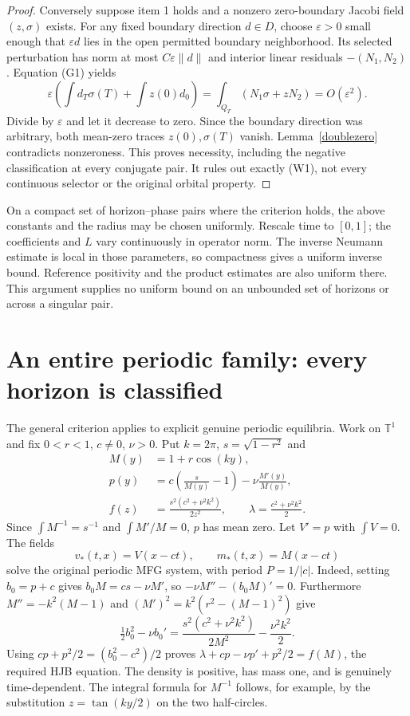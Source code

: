 \documentclass[11pt,a4paper]{article}
\begin{document}
\begin{proof}
Conversely suppose item 1 holds and a nonzero zero-boundary Jacobi
field $(z,\sigma)$ exists. For any fixed boundary direction
$d\in D$, choose $\varepsilon>0$ small enough that $\varepsilon d$
lies in the open permitted boundary neighborhood. Its selected
perturbation has norm at most $C\varepsilon\|d\|$ and interior
linear residuals $-(N_1,N_2)$. Equation (G1) yields
\[
 \varepsilon\left(\int d_T\sigma(T)+\int z(0)d_0\right)
   =\int_{Q_T}(N_1\sigma+zN_2)=O(\varepsilon^2).
\]
Divide by $\varepsilon$ and let it decrease to zero. Since the
boundary direction was arbitrary, both mean-zero traces
$z(0),\sigma(T)$ vanish. Lemma~\ref{doublezero} contradicts
nonzeroness. This proves necessity, including the negative
classification at every conjugate pair. It rules out exactly (W1),
not every continuous selector or the original orbital property.
\end{proof}

On a compact set of horizon--phase pairs where the criterion holds,
the above constants and the radius may be chosen uniformly. Rescale
time to $[0,1]$; the coefficients and $L$ vary continuously in operator
norm. The inverse Neumann estimate is local in those parameters, so
compactness gives a uniform inverse bound. Reference positivity and
the product estimates are also uniform there. This argument supplies
no uniform bound on an unbounded set of horizons or across a singular
pair.

\section{An entire periodic family: every horizon is classified}
The general criterion applies to explicit genuine
periodic equilibria. Work on $\mathbb T^1$ and fix
$0<r<1$, $c\ne0$, $\nu>0$. Put $k=2\pi$, $s=\sqrt{1-r^2}$ and
\begin{equation}\tag{TW1}\label{TW1}
 \begin{aligned}
 M(y)&=1+r\cos(ky),\\
 p(y)&=c\left(\frac{s}{M(y)}-1\right)-\nu\frac{M'(y)}{M(y)},\\
 f(z)&=\frac{s^2(c^2+\nu^2k^2)}{2z^2},\qquad
 \lambda=\frac{c^2+\nu^2k^2}{2}.
 \end{aligned}
\end{equation}
Since $\int M^{-1}=s^{-1}$ and $\int M'/M=0$, $p$ has mean zero.
Let $V'=p$ with $\int V=0$. The fields
\begin{equation}\tag{TW2}\label{TW2}
 v_*(t,x)=V(x-ct),\qquad m_*(t,x)=M(x-ct)
\end{equation}
solve the original periodic MFG system, with period $P=1/|c|$.
Indeed, setting $b_0=p+c$ gives
$b_0M=cs-\nu M'$, so $-\nu M''-(b_0M)'=0$.
Furthermore $M''=-k^2(M-1)$ and
$(M')^2=k^2(r^2-(M-1)^2)$ give
\[
 \tfrac12b_0^2-\nu b_0'
 =\frac{s^2(c^2+\nu^2k^2)}{2M^2}-\frac{\nu^2k^2}{2}.
\]
Using $cp+p^2/2=(b_0^2-c^2)/2$ proves
$\lambda+cp-\nu p'+p^2/2=f(M)$, the required HJB equation.
The density is positive, has mass one, and is genuinely time-dependent.
The integral formula for $M^{-1}$ follows, for example, by the
substitution $z=\tan(k y/2)$ on the two half-circles.
\end{document}
